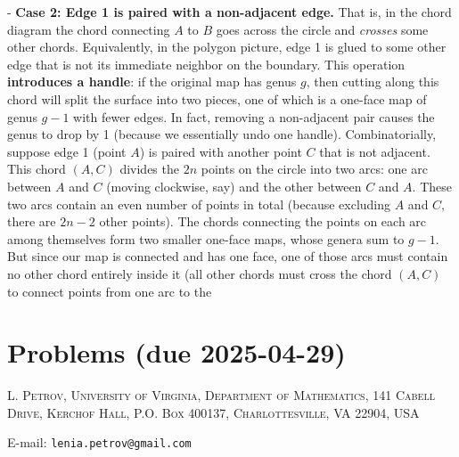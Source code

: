 \documentclass[letterpaper,11pt,oneside,reqno]{article}
\numberwithin{equation}{section}
\theoremstyle{definition}
\begin{document}
- \textbf{Case 2: Edge 1 is paired with a non-adjacent edge.} That is, in the chord diagram the chord connecting $A$ to $B$ goes across the circle and \emph{crosses} some other chords. Equivalently, in the polygon picture, edge 1 is glued to some other edge that is not its immediate neighbor on the boundary. This operation \textbf{introduces a handle}: if the original map has genus $g$, then cutting along this chord will split the surface into two pieces, one of which is a one-face map of genus $g-1$ with fewer edges. In fact, removing a non-adjacent pair causes the genus to drop by 1 (because we essentially undo one handle). Combinatorially, suppose edge 1 (point $A$) is paired with another point $C$ that is not adjacent. This chord $(A,C)$ divides the $2n$ points on the circle into two arcs: one arc between $A$ and $C$ (moving clockwise, say) and the other between $C$ and $A$. These two arcs contain an even number of points in total (because excluding $A$ and $C$, there are $2n-2$ other points). The chords connecting the points on each arc among themselves form two smaller one-face maps, whose genera sum to $g-1$. But since our map is connected and has one face, one of those arcs must contain no other chord entirely inside it (all other chords must cross the chord $(A,C)$ to connect points from one arc to the
























\appendix
\setcounter{section}{14}

\section{Problems (due 2025-04-29)}









\medskip

\textsc{L. Petrov, University of Virginia, Department of Mathematics, 141 Cabell Drive, Kerchof Hall, P.O. Box 400137, Charlottesville, VA 22904, USA}

E-mail: \texttt{lenia.petrov@gmail.com}
\end{document}
